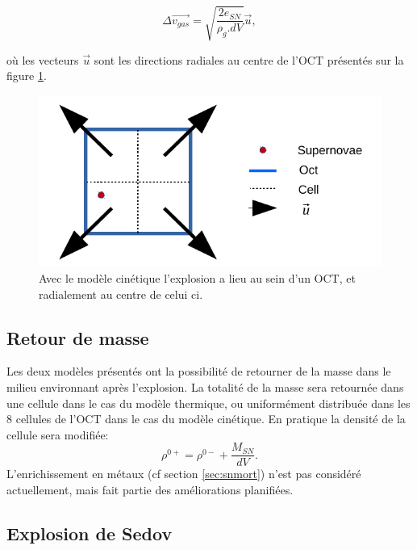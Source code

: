 \begin{equation}
    \Delta \overrightarrow{v_{gas}} = \sqrt{\frac{2e_{SN}}{\rho_g.dV}} \overrightarrow{u},
    \label{eq_sn_direct}
\end{equation}

où les vecteurs $\overrightarrow{u}$ sont les directions radiales au centre de l'OCT présentés sur la figure \ref{fig:kin}.

\begin{figure}
        \includegraphics[width=.95\linewidth]{img/03/oct_kinetic.pdf} 
        \caption[Injection d'énergie cinétique]{Avec le modèle cinétique l'explosion a lieu au sein d'un OCT, et radialement au centre de celui ci.
 		\label{fig:kin}}
\end{figure}

\subsection{Retour de masse}
Les deux modèles présentés ont la possibilité de retourner de la masse dans le milieu environnant après l'explosion.
La totalité de la masse sera retournée dans une cellule dans le cas du modèle thermique, ou uniformément distribuée dans les 8 cellules de l'OCT dans le cas du modèle cinétique.
En pratique la densité de la cellule sera modifiée:
\begin{equation}
\rho^{0+} = \rho^{0-} + \frac{M_{SN}}{dV}.
\end{equation}
L’enrichissement en métaux (cf section \ref{sec:snmort}) n'est pas considéré actuellement, mais fait partie des améliorations planifiées.

\subsection{Explosion de Sedov}
\label{sec:sedov}


